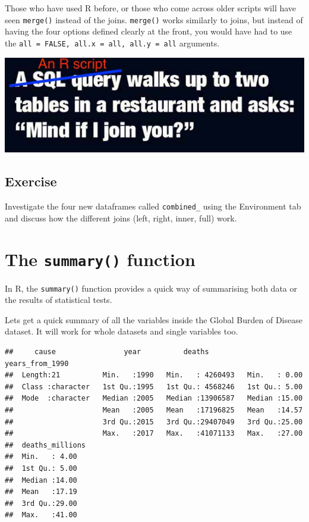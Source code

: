 \documentclass[12pt,]{krantz}
\makeatletter
\newenvironment{Shaded}{\begin{snugshade}}{\end{snugshade}}
\newcommand{\KeywordTok}[1]{\textcolor[rgb]{0.13,0.29,0.53}{\textbf{#1}}}
\newcommand{\NormalTok}[1]{#1}
\newcommand{\OperatorTok}[1]{\textcolor[rgb]{0.81,0.36,0.00}{\textbf{#1}}}
\newcommand{\StringTok}[1]{\textcolor[rgb]{0.31,0.60,0.02}{#1}}
\newenvironment{kframe}{%
\medskip{}
\setlength{\fboxsep}{.8em}
 \def\at@end@of@kframe{}%
 \ifinner\ifhmode%
  \def\at@end@of@kframe{\end{minipage}}%
  \begin{minipage}{\columnwidth}%
 \fi\fi%
 \def\FrameCommand##1{\hskip\@totalleftmargin \hskip-\fboxsep
 \colorbox{shadecolor}{##1}\hskip-\fboxsep
     \hskip-\linewidth \hskip-\@totalleftmargin \hskip\columnwidth}%
 \MakeFramed {\advance\hsize-\width
   \@totalleftmargin\z@ \linewidth\hsize
   \@setminipage}}%
 {\par\unskip\endMakeFramed%
 \at@end@of@kframe}
\renewenvironment{Shaded}{\begin{kframe}}{\end{kframe}}
\theoremstyle{definition}
\theoremstyle{definition}
\theoremstyle{definition}
\theoremstyle{remark}
\makeatother
\begin{document}
Those who have used R before, or those who come across older scripts
will have seen \texttt{merge()} instead of the joins. \texttt{merge()}
works similarly to joins, but instead of having the four options defined
clearly at the front, you would have had to use the
\texttt{all\ =\ FALSE,\ all.x\ =\ all,\ all.y\ =\ all} arguments.

\includegraphics{images/databasejoke.jpg}

\hypertarget{exercise-8}{%
\subsection{Exercise}\label{exercise-8}}

Investigate the four new dataframes called \texttt{combined\_} using the
Environment tab and discuss how the different joins (left, right, inner,
full) work.

\hypertarget{the-summary-function}{%
\section{\texorpdfstring{The \texttt{summary()}
function}{The summary() function}}\label{the-summary-function}}

In R, the \texttt{summary()} function provides a quick way of
summarising both data or the results of statistical tests.

Lets get a quick summary of all the variables inside the Global Burden
of Disease dataset. It will work for whole datasets and single variables
too.

\begin{Shaded}
\end{Shaded}

\begin{verbatim}
##     cause                year          deaths         years_from_1990
##  Length:21          Min.   :1990   Min.   : 4260493   Min.   : 0.00  
##  Class :character   1st Qu.:1995   1st Qu.: 4568246   1st Qu.: 5.00  
##  Mode  :character   Median :2005   Median :13906587   Median :15.00  
##                     Mean   :2005   Mean   :17196825   Mean   :14.57  
##                     3rd Qu.:2015   3rd Qu.:29407049   3rd Qu.:25.00  
##                     Max.   :2017   Max.   :41071133   Max.   :27.00  
##  deaths_millions
##  Min.   : 4.00  
##  1st Qu.: 5.00  
##  Median :14.00  
##  Mean   :17.19  
##  3rd Qu.:29.00  
##  Max.   :41.00
\end{verbatim}
\end{document}
